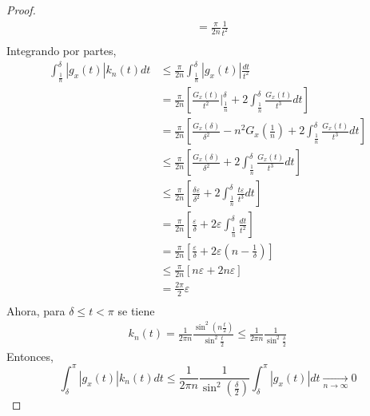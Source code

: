 \documentclass[12pt]{report}
\newcounter{it}
\theoremstyle{largebreak}
\renewcommand{\leq}{\ensuremath{\leqslant}}
\newcommand\abs[1]{\ensuremath{\left|#1\right|}}
\begin{document}
\begin{proof}
\begin{equation*}
\begin{split}
                &=\frac{\pi}{2n}\frac{1}{t^2}\\
            \end{split}
        \end{equation*}
        Integrando por partes,
        \begin{equation*}
            \begin{split}
                \int_{\frac{1}{n}}^\delta\abs{g_x(t)}k_n(t)dt&\leq\frac{\pi}{2n}\int_{\frac{1}{n}}^\delta\abs{g_x(t)}\frac{dt}{t^2}\\
                &=\frac{\pi}{2n}\left[\frac{G_x(t)}{t^2}\Big|_{\frac{1}{n}}^{\delta}+2\int_{\frac{1}{n}}^\delta \frac{G_x(t)}{t^3}dt\right]\\
                &=\frac{\pi}{2n}\left[\frac{G_x(\delta)}{\delta^2}-n^2G_x\left(\frac{1}{n}\right)+2\int_{\frac{1}{n}}^\delta \frac{G_x(t)}{t^3}dt\right]\\
                &\leq\frac{\pi}{2n}\left[\frac{G_x(\delta)}{\delta^2}+2\int_{\frac{1}{n}}^\delta \frac{G_x(t)}{t^3}dt\right]\\
                &\leq\frac{\pi}{2n}\left[\frac{\delta\varepsilon}{\delta^2}+2\int_{\frac{1}{n}}^\delta \frac{t\varepsilon}{t^3}dt\right]\\
                &=\frac{\pi}{2n}\left[\frac{\varepsilon}{\delta}+2\varepsilon\int_{\frac{1}{n}}^\delta \frac{dt}{t^2}\right]\\
                &=\frac{\pi}{2n}\left[\frac{\varepsilon}{\delta}+2\varepsilon\left(n-\frac{1}{\delta} \right) \right]\\
                &\leq\frac{\pi}{2n}\left[n\varepsilon+2n\varepsilon\right]\\
                &=\frac{2\pi}{2}\varepsilon\\
            \end{split}
        \end{equation*}
        Ahora, para $\delta\leq t<\pi$ se tiene
        \begin{equation*}
            \begin{split}
                k_n(t)=\frac{1}{2\pi n}\frac{\sin^2\left(n\frac{t}{2} \right)}{\sin^2\frac{t}{2}}\leq\frac{1}{2\pi n}\frac{1}{\sin^2\frac{\delta}{2}}
            \end{split}
        \end{equation*}
        Entonces,
        \begin{equation*}
            \int_\delta^{\pi}\abs{g_x(t)}k_n(t)dt\leq\frac{1}{2\pi n}\frac{1}{\sin^2\left(\frac{\delta}{2} \right)}\int_\delta^{\pi}\abs{g_x(t)}dt\underset{ n\rightarrow\infty}{\rightarrow}0

\end{equation*}
\end{proof}
\end{document}
